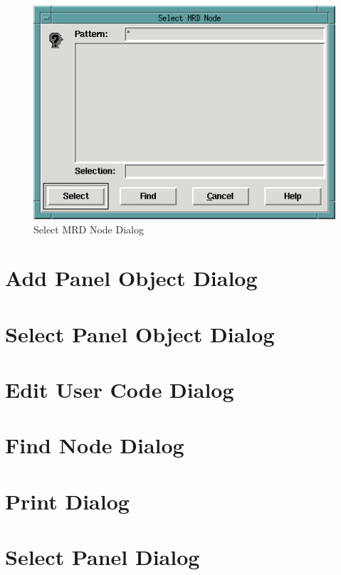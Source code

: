 \begin{figure}[hbpt]
\begin{centering}
\includegraphics{SelectMRDNodeDialog.png}
\caption{Select MRD Node Dialog}
\label{fig:dispatcher:selectmrdnodedialog}
\end{centering}
\end{figure}

\section{Add Panel Object Dialog}
\section{Select Panel Object Dialog}
\section{Edit User Code Dialog}
\section{Find Node Dialog}
\section{Print Dialog}
\section{Select Panel Dialog}

